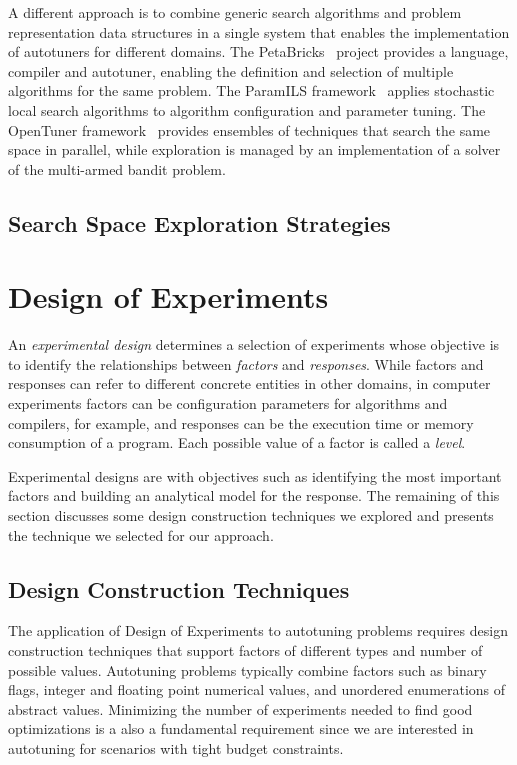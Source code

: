 \documentclass[conference]{IEEEtran}
\begin{document}
A different approach is to combine generic search algorithms and problem
representation data structures in a single system that enables the
implementation of autotuners for different domains. The
PetaBricks~\cite{ansel2009petabricks} project provides a language,
compiler and autotuner, enabling the definition and selection of multiple
algorithms for the same problem. The ParamILS
framework~\cite{hutter2009paramils} applies stochastic local search
algorithms to algorithm configuration and parameter tuning. The OpenTuner
framework~\cite{ansel2014opentuner} provides ensembles of techniques that
search the same space in parallel, while exploration is managed by an
implementation of a solver of the multi-armed bandit problem.
\subsection{Search Space Exploration Strategies}
\label{sec:org29c33e4}
\section{Design of Experiments}
\label{sec:org8930df5}
An \emph{experimental design} determines a selection of experiments whose objective
is to identify the relationships between \emph{factors} and \emph{responses}. While
factors and responses can refer to different concrete entities in other domains,
in computer experiments factors can be configuration parameters for algorithms
and compilers, for example, and responses can be the execution time or memory
consumption of a program. Each possible value of a factor is called a \emph{level}.

Experimental designs are with objectives such as identifying the most important
factors and building an analytical model for the response. The remaining of this
section discusses some design construction techniques we explored and presents
the technique we selected for our approach.
\subsection{Design Construction Techniques}
\label{sec:org6aa4aae}
The application of Design of Experiments to autotuning problems requires design
construction techniques that support factors of different types and number of
possible values. Autotuning problems typically combine factors such as binary
flags, integer and floating point numerical values, and unordered enumerations
of abstract values. Minimizing the number of experiments needed to find good
optimizations is a also a fundamental requirement since we are interested in
autotuning for scenarios with tight budget constraints.
\end{document}
